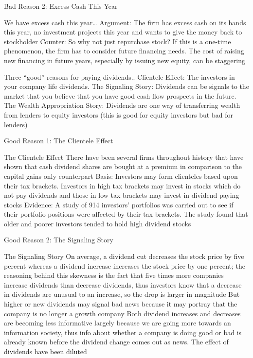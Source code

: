 \documentclass[10pt]{article}
\begin{document}
    \begin{core}{Bad Reason 2: Excess Cash This Year}

      We have excess cash this year…
      Argument: The firm has excess cash on its hands this year, no investment projects this year and wants to give the money back to stockholder
      Counter: So why not just repurchase stock? If this is a one-time phenomenon, the firm has to consider future financing needs. The cost of raising new financing in future years, especially by issuing new equity, can be staggering

    \end{core}

    Three “good” reasons for paying dividends..
    Clientele Effect: The investors in your company life dividends.
    The Signaling Story: Dividends can be signals to the market that you believe that you have good cash flow prospects in the future.
    The Wealth Appropriation Story: Dividends are one way of transferring wealth from lenders to equity investors (this is good for equity investors but bad for lenders)

    \begin{core}{Good Reason 1: The Clientele Effect}

      The Clientele Effect
      There have been several firms throughout history that have shown that cash dividend shares are bought at a premium in comparison to the capital gains only counterpart
      Basis: Investors may form clienteles based upon their tax brackets. Investors in high tax brackets may invest in stocks which do not pay dividends and those in low tax brackets may invest in dividend paying stocks
      Evidence: A study of 914 investors’ portfolios was carried out to see if their portfolio positions were affected by their tax brackets. The study found that older and poorer investors tended to hold high dividend stocks

    \end{core}

    \begin{core}{Good Reason 2: The Signaling Story}

      The Signaling Story
      On average, a dividend cut decreases the stock price by five percent whereas a dividend increase increases the stock price by one percent; the reasoning behind this skewness is the fact that five times more companies increase dividends than decrease dividends, thus investors know that a decrease in dividends are unusual to an increase, so the drop is larger in magnitude
      But higher or new dividends may signal bad news because it may portray that the company is no longer a growth company
      Both dividend increases and decreases are becoming less informative largely because we are going more towards an information society, thus info about whether a company is doing good or bad is already known before the dividend change comes out as news. The effect of dividends have been diluted

    \end{core}
\end{document}
